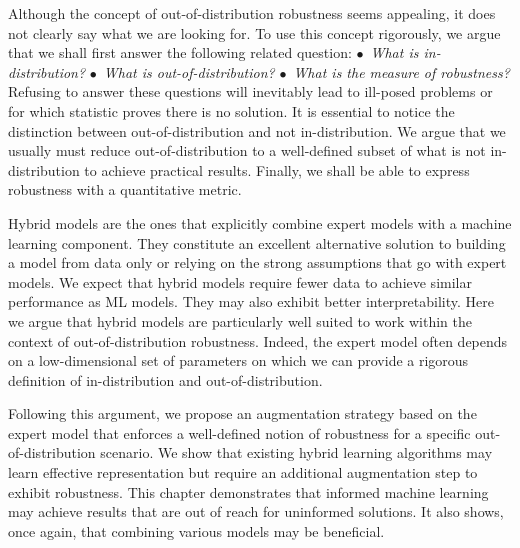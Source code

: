 Although the concept of out-of-distribution robustness seems appealing, it does not clearly say what we are looking for. To use this concept rigorously, we argue that we shall first answer the following related question: $\bullet$~\textit{What is in-distribution?} $\bullet$~\textit{What is out-of-distribution?}  $\bullet$~\textit{What is the measure of robustness?} Refusing to answer these questions will inevitably lead to ill-posed problems or for which statistic proves there is no solution. It is essential to notice the distinction between out-of-distribution and not in-distribution. We argue that we usually must reduce out-of-distribution to a well-defined subset of what is not in-distribution to achieve practical results. Finally, we shall be able to express robustness with a quantitative metric.

Hybrid models are the ones that explicitly combine expert models with a machine learning component. They constitute an excellent alternative solution to building a model from data only or relying on the strong assumptions that go with expert models. We expect that hybrid models require fewer data to achieve similar performance as ML models. They may also exhibit better interpretability. Here we argue that hybrid models are particularly well suited to work within the context of out-of-distribution robustness. Indeed, the expert model often depends on a low-dimensional set of parameters on which we can provide a rigorous definition of in-distribution and out-of-distribution.

Following this argument, we propose an augmentation strategy based on the expert model that enforces a well-defined notion of robustness for a specific out-of-distribution scenario. We show that existing hybrid learning algorithms may learn effective representation but require an additional augmentation step to exhibit robustness. This chapter demonstrates that informed machine learning may achieve results that are out of reach for uninformed solutions. It also shows, once again, that combining various models may be beneficial.

